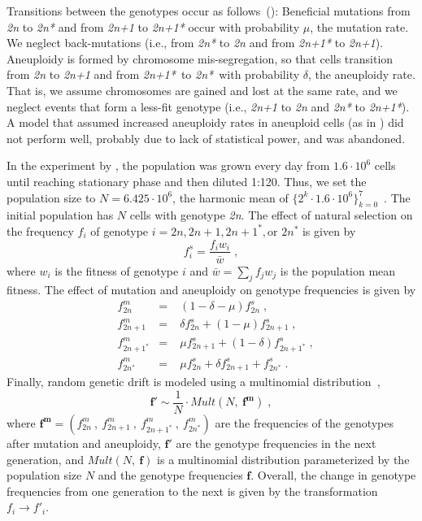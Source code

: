 \documentclass[12pt]{extarticle}
\let\vec\mathbf
\newcommand{\euwt}{\emph{2n}}
\newcommand{\anwt}{\emph{2n+1}}
\newcommand{\eumt}{\emph{2n*}}
\newcommand{\anmt}{\emph{2n+1*}}
\begin{document}
Transitions between the genotypes occur as follows~(): Beneficial mutations from \euwt\; to \eumt\; and from \anwt\; to \anmt\; occur with probability $\mu$, the mutation rate. We neglect back-mutations (i.e., from \eumt\; to \euwt\; and from \anmt\; to \anwt).
Aneuploidy is formed by chromosome mis-segregation, so that cells transition from \euwt\; to \anwt\; and from \anmt\ to \eumt\ with probability $\delta$, the aneuploidy rate. That is, we assume chromosomes are gained and lost at the same rate, and we neglect events that form a less-fit genotype (i.e., \anwt\; to \euwt\; and \eumt\; to \anmt). A model that assumed increased aneuploidy rates in aneuploid cells (as in \citet{Sheltzer2011b}) did not perform well, probably due to lack of statistical power, and was abandoned.

In the experiment by \citet{Yona2012}, the population was grown every day from $1.6 \cdot 10^6$ cells until reaching stationary phase and then diluted 1:120.
Thus, we set the population size to $N=6.425 \cdot 10^6$, the harmonic mean of $\{2^k \cdot 1.6 \cdot 10^6\}_{k=0}^{7}$~\citep{Crow1970}.
The initial population has $N$ cells with genotype \euwt. 
The effect of natural selection on the frequency $f_i$ of genotype $i = 2n, 2n+1, 2n+1^*, \text{or } 2n^*$ is given by
    \begin{equation} \label{eq:selection-single} 
      f^s_i = \frac{f_i w_i}{\bar{w}} \;,
    \end{equation}
where $w_i$ is the fitness of genotype $i$ and $\bar{w} = \sum_{j}{f_j w_j}$ is the population mean fitness.
The effect of mutation and aneuploidy on genotype frequencies is given by
    \begin{equation} \label{eq:mutation-aneuploidy-single}
    \begin{aligned}
      &f^m_{2n} &=&\; (1 - \delta - \mu) f^s_{2n}  \;,\\
      &f^m_{2n+1} &=&\; \delta f^s_{2n} + (1 - \mu) f^s_{2n+1}  \;,\\
      &f^m_{2n+1^*} &=&\; \mu f^s_{2n+1} + (1-\delta) f^s_{2n+1^*}  \;,\\
      &f^m_{2n^*} &=&\; \mu f^s_{2n} + \delta f^s_{2n+1} + f^s_{2n^*}  \;.
    \end{aligned}
    \end{equation}
Finally, random genetic drift is modeled using a multinomial distribution~\citep{Otto2007},
    \begin{equation} \label{eq:drift-single}
      \vec{f'} \sim \frac{1}{N} \cdot \mathit{Mult}(N,\ \vec{f^m}) \;,
    \end{equation}
where $\vec{f^m}=(f^m_{2n}\ ,\ f^m_{2n+1}\ ,\ f^m_{2n+1^*}\ ,\ f^m_{2n^*})$ are the frequencies of the genotypes after mutation and aneuploidy, $\vec{f'}$ are the genotype frequencies in the next generation, and $Mult(N,\ \vec{f})$ is a multinomial distribution parameterized by the population size $N$ and the genotype frequencies $\vec{f}$.
Overall, the change in genotype frequencies from one generation to the next is given by the transformation $f_i \to f'_i$.
\end{document}
